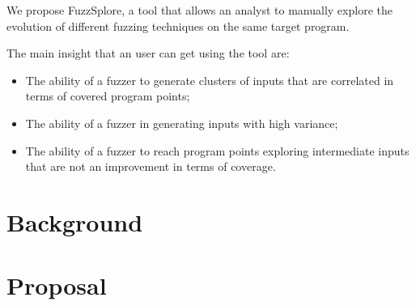 \documentclass[conference,compsoc]{IEEEtran}
\begin{document}
We propose FuzzSplore, a tool that allows an analyst to manually explore the evolution of different fuzzing techniques on the same target program.

The main insight that an user can get using the tool are:

\begin{itemize}
\item The ability of a fuzzer to generate clusters of inputs that are correlated in terms of covered program points;
\item The ability of a fuzzer in generating inputs with high variance;
\item The ability of a fuzzer to reach program points exploring intermediate inputs that are not an improvement in terms of coverage.
\end{itemize}

\section{Background}



\section{Proposal}

\cite{besensitive}



\end{document}

